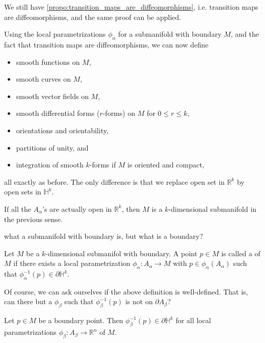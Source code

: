 \documentclass[notoc,notitlepage]{tufte-book}
\begin{document}
We still have \cref{propo:transition_maps_are_diffeomorphisms}, i.e. 
transition maps are diffeomorphisms, and the same proof can be applied.

\begin{remark}
  Using the local parametrizations $\phi_\alpha$ for a submanifold with boundary
  $M$, and the fact that transition maps are diffeomorphisms, we can now define
  \begin{itemize}
    \item smooth functions on $M$,
    \item smooth curves on $M$, 
    \item smooth vector fields on $M$,
    \item smooth differential forms ($r$-forms) on $M$ for $0 \leq r \leq k$,
    \item orientations and orientability,
    \item partitions of unity, and
    \item integration of smooth $k$-forms if $M$ is oriented and compact,
  \end{itemize}
  all exactly as before. The only difference is that we replace open set in
  $\mathbb{R}^k$ by open sets in $\mathbb{H}^k$.
\end{remark}

\begin{remark}
  If all the $A_\alpha$'s are actually open in $\mathbb{R}^k$, then $M$ is a
  $k$-dimensional submanifold in the previous sense.
\end{remark}

 what a submanifold with boundary is, but what is a
boundary?

\begin{defn}\label{defn:boundary_point_on_a_submanifold}
  Let $M$ be a $k$-dimensional submanifol with boundary. A point $p \in M$ is
  called a  of $M$ if there exists a local
  parametrization $\phi_\alpha : A_\alpha \to M$ with $p \in
  \phi_\alpha(A_\alpha)$ such that $\phi_\alpha^{-1} (p) \in \partial
  \mathbb{H}^k$.
\end{defn}

Of course, we can ask ourselves if the above definition is well-defined. That
is, can there but a $\phi_\beta$ such that $\phi_\beta^{-1}(p)$ is not on
$\partial A_\beta$?

\begin{propo}\label{propo:well_definedness_of_the_boundary_of_a_manifold}
  Let $p \in M$ be a boundary point. Then $\phi_\beta^{-1}(p) \in \partial
  \mathbb{H}^k$ for all local parametrizations $\phi_\beta : A_\beta \to
  \mathbb{R}^n$ of  $M$.
\end{propo}
\end{document}
